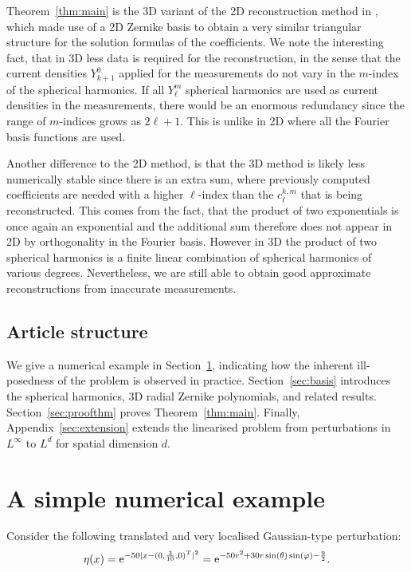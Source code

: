 \documentclass[reqno]{amsart}
\numberwithin{equation}{section}
\numberwithin{figure}{section}
\numberwithin{table}{section}
\theoremstyle{plain}
\theoremstyle{definition}
\theoremstyle{remark}
\newcommand{\abs}[1]{\lvert#1\rvert}
\newcommand{\e}{\mathrm{e}}    %
\begin{document}
Theorem~\ref{thm:main} is the 3D variant of the 2D reconstruction method in \cite[Theorem~1.3]{Garde2024a}, which made use of a 2D Zernike basis \cite{Zernike1934} to obtain a very similar triangular structure for the solution formulas of the coefficients. We note the interesting fact, that in 3D less data is required for the reconstruction, in the sense that the current densities $Y_{k+1}^{0}$ applied for the measurements do not vary in the $m$-index of the spherical harmonics. If all $Y_\ell^m$ spherical harmonics are used as current densities in the measurements, there would be an enormous redundancy since the range of $m$-indices grows as $2\ell+1$. This is unlike in 2D where all the Fourier basis functions are used. 

Another difference to the 2D method, is that the 3D method is likely less numerically stable since there is an extra sum, where previously computed coefficients are needed with a higher $\ell$-index than the $c_{\ell}^{k,m}$ that is being reconstructed. This comes from the fact, that the product of two exponentials is once again an exponential and the additional sum therefore does not appear in 2D by orthogonality in the Fourier basis. However in 3D the product of two spherical harmonics is a finite linear combination of spherical harmonics of various degrees. Nevertheless, we are still able to obtain good approximate reconstructions from inaccurate measurements.

\subsection{Article structure} 

We give a numerical example in Section~\ref{sec:numerical}, indicating how the inherent ill-posedness of the problem is observed in practice. Section~\ref{sec:basis} introduces the spherical harmonics, 3D radial Zernike polynomials, and related results. Section~\ref{sec:proofthm} proves Theorem~\ref{thm:main}. Finally, Appendix~\ref{sec:extension} extends the linearised problem from perturbations in $L^\infty$ to $L^d$ for spatial dimension $d$.

\section{A simple numerical example} \label{sec:numerical}

Consider the following translated and very localised Gaussian-type perturbation:
%
\begin{equation} \label{eq:etaexample}
    \eta(x) = \e^{-50\abs{x - (0,\frac{3}{10},0)^{\textup{T}}}^2} = \e^{-50r^2+30r\sin(\theta)\sin(\varphi)-\frac{9}{2}}.
\end{equation}
\end{document}
